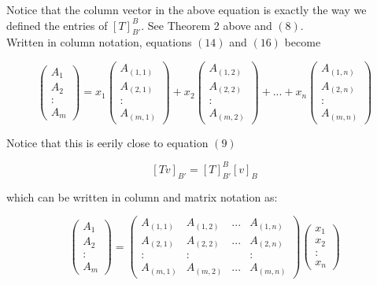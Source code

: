 \documentclass{article}
\theoremstyle{problemstyle}
\begin{document}
Notice that the column vector in the above equation is exactly the way we defined the entries of $[T]^B_{B'}$. See Theorem 2 above and $(8)$.\\

Written in column notation, equations $(14)$ and $(16)$ become  

\begin{equation}
 \begin{pmatrix} A_1 \\ A_2 \\ : \\ A_m \end{pmatrix} = 
x_1\begin{pmatrix} A_{(1,1)} \\A_{(2,1)} \\ : \\ A_{(m,1)} \end{pmatrix} + x_2\begin{pmatrix} A_{(1,2)} \\A_{(2,2)} \\ : \\ A_{(m,2)} \end{pmatrix} + ... +
x_n\begin{pmatrix} A_{(1,n)} \\A_{(2,n)} \\ : \\ A_{(m,n)} \end{pmatrix}
\end{equation}

Notice that this is eerily close to equation $(9)$ 

$$
    [Tv]_{B'} = [T]^B_{B'} [v]_B 
$$

which can be written in column and matrix notation as: 

\begin{equation}
\begin{pmatrix} A_1 \\ A_2 \\ : \\ A_m \end{pmatrix} = 
\begin{pmatrix} A_{(1,1)} & A_{(1,2)}&  ... & A_{(1,n)} \\
A_{(2,1)} & A_{(2,2)} & ... & A_{(2,n)} \\: & : &   & : \\ A_{(m,1)}& A_{(m,2)} &... & A_{(m,n)} \end{pmatrix} \begin{pmatrix} x_1 \\ x_2 \\ : \\ x_n \end{pmatrix}
\end{equation}
\end{document}
